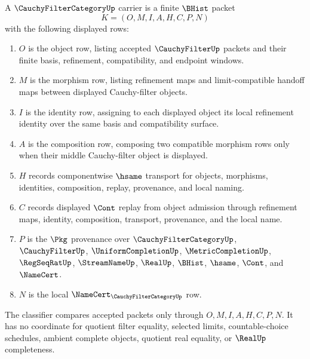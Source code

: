 \begin{definition}
\label{def:cauchy-filter-category-carrier}
A $\CauchyFilterCategoryUp$ carrier is a finite $\BHist$ packet
$$
K=(O,M,I,A,H,C,P,N)
$$
with the following displayed rows:
\begin{enumerate}
\item $O$ is the object row, listing accepted $\CauchyFilterUp$ packets and their finite basis, refinement, compatibility, and endpoint windows.
\item $M$ is the morphism row, listing refinement maps and limit-compatible handoff maps between displayed Cauchy-filter objects.
\item $I$ is the identity row, assigning to each displayed object its local refinement identity over the same basis and compatibility surface.
\item $A$ is the composition row, composing two compatible morphism rows only when their middle Cauchy-filter object is displayed.
\item $H$ records componentwise $\hsame$ transport for objects, morphisms, identities, composition, replay, provenance, and local naming.
\item $C$ records displayed $\Cont$ replay from object admission through refinement maps, identity, composition, transport, provenance, and the local name.
\item $P$ is the $\Pkg$ provenance over $\CauchyFilterCategoryUp$, $\CauchyFilterUp$, $\UniformCompletionUp$, $\MetricCompletionUp$, $\RegSeqRatUp$, $\StreamNameUp$, $\RealUp$, $\BHist$, $\hsame$, $\Cont$, and $\NameCert$.
\item $N$ is the local $\NameCert_{\CauchyFilterCategoryUp}$ row.
\end{enumerate}
The classifier compares accepted packets only through $O,M,I,A,H,C,P,N$. It has no coordinate for quotient filter equality, selected limits, countable-choice schedules, ambient complete objects, quotient real equality, or $\RealUp$ completeness.
\end{definition}


